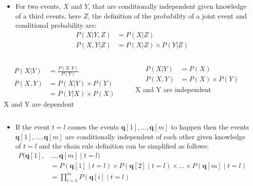 \documentclass[xcolor={table}]{beamer}
\begin{document}
\begin{frame} 
\begin{itemize}
\item For two events, $X$ and $Y$, that are conditionally independent given knowledge of a third events, here $Z$, the definition of the probability of a joint event and conditional probability are:
\begin{alignat*}{2}
P(X|Y,Z)&=P(X|Z)\\
P(X,Y|Z)&=P(X|Z) \times P(Y|Z)
\end{alignat*}
\end{itemize}
\begin{block}{}
\begin{columns}[c]
	\begin{column}{0.4\textwidth}
\begin{alignat*}{2}
P(X|Y)&=\displaystyle \frac{P(X,Y)}{P(Y)}\\
P(X,Y)&=P(X|Y) \times P(Y)\\&=P(Y|X) \times P(X)
\end{alignat*}
X and Y are \alert{dependent}
	\end{column}
	\begin{column}{0.4\textwidth}
	\begin{alignat*}{2}
P(X|Y)&=P(X)\\
P(X,Y)&=P(X) \times P(Y)
\end{alignat*}
X and Y are \alert{independent}
	\end{column}
\end{columns}
\end{block}
\end{frame} 

\begin{frame}
\begin{itemize}
\item If the event $t=l$ causes the events $\mathbf{q}[1],\dots,\mathbf{q}[m]$ to happen then the events $\mathbf{q}[1],\dots,\mathbf{q}[m]$ are conditionally independent of each other given knowledge of $t=l$ and the chain rule definition can be simplified as follows:
\begin{alignat*}{2}
P(\mathbf{q}[1],&\dots,\mathbf{q}[m] \mid t=l) \\
&=P(\mathbf{q}[1]\mid t=l) \times P(\mathbf{q}[2] \mid t=l) \times \dots \times P(\mathbf{q}[m] \mid t=l) \\
&=\prod_{i=1}^{m} P(\mathbf{q}[i]\mid t=l) \\
\end{alignat*}
\end{itemize}
\end{frame} 
\end{document}
